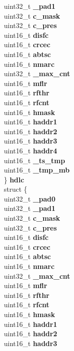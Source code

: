 \begin{DoxyCompactItemize}
\begin{tabbing}
\>\>uint32\_t {\bfseries \_pad1}\\
\>\>uint32\_t {\bfseries c\_mask}\\
\>\>uint32\_t {\bfseries c\_pres}\\
\>\>uint16\_t {\bfseries disfc}\\
\>\>uint16\_t {\bfseries crcec}\\
\>\>uint16\_t {\bfseries abtsc}\\
\>\>uint16\_t {\bfseries nmarc}\\
\>\>uint32\_t {\bfseries \_max\_cnt}\\
\>\>uint16\_t {\bfseries mflr}\\
\>\>uint16\_t {\bfseries rfthr}\\
\>\>uint16\_t {\bfseries rfcnt}\\
\>\>uint16\_t {\bfseries hmask}\\
\>\>uint16\_t {\bfseries haddr1}\\
\>\>uint16\_t {\bfseries haddr2}\\
\>\>uint16\_t {\bfseries haddr3}\\
\>\>uint16\_t {\bfseries haddr4}\\
\>\>uint16\_t {\bfseries \_ts\_tmp}\\
\>\>uint16\_t {\bfseries \_tmp\_mb}\\
\>\} {\bfseries hdlc}\\
\>struct \{\\
\>\>uint32\_t {\bfseries \_pad0}\\
\>\>uint32\_t {\bfseries \_pad1}\\
\>\>uint32\_t {\bfseries c\_mask}\\
\>\>uint32\_t {\bfseries c\_pres}\\
\>\>uint16\_t {\bfseries disfc}\\
\>\>uint16\_t {\bfseries crcec}\\
\>\>uint16\_t {\bfseries abtsc}\\
\>\>uint16\_t {\bfseries nmarc}\\
\>\>uint32\_t {\bfseries \_max\_cnt}\\
\>\>uint16\_t {\bfseries mflr}\\
\>\>uint16\_t {\bfseries rfthr}\\
\>\>uint16\_t {\bfseries rfcnt}\\
\>\>uint16\_t {\bfseries hmask}\\
\>\>uint16\_t {\bfseries haddr1}\\
\>\>uint16\_t {\bfseries haddr2}\\
\>\>uint16\_t {\bfseries haddr3}\\

\end{tabbing}
\end{DoxyCompactItemize}
